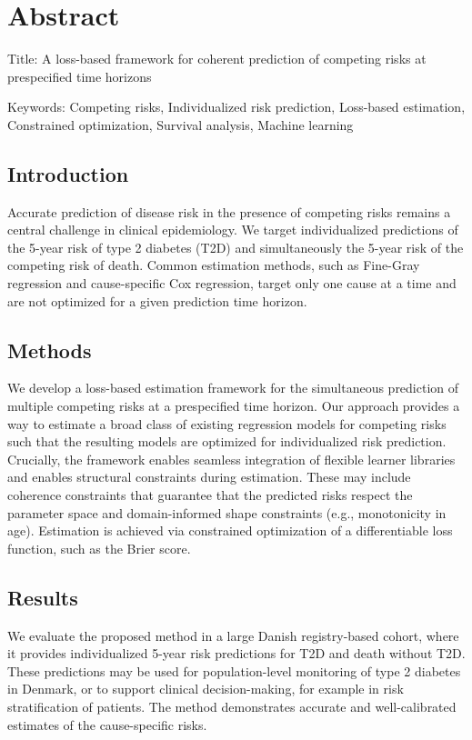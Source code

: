 \documentclass[11pt]{article}
\author{Hjalte Søberg Mikkelsen}
\date{\today}
\title{}
\begin{document}
\tableofcontents

\section{Abstract}
\label{sec:org7ab9e6a}
Title: A loss-based framework for coherent prediction of competing risks at prespecified time horizons

Keywords: Competing risks, Individualized risk prediction, Loss-based
          estimation, Constrained optimization, Survival analysis, Machine learning

\subsection{Introduction}
\label{sec:orga21d434}
Accurate prediction of disease risk in the presence of competing risks remains a central challenge in clinical epidemiology. We target individualized predictions of the 5-year risk of type 2 diabetes (T2D) and simultaneously the 5-year risk of the competing risk of death. Common estimation methods, such as Fine-Gray regression and cause-specific Cox regression, target only one cause at a time and are not optimized for a given prediction time horizon.

\subsection{Methods}
\label{sec:orgfb22391}
We develop a loss-based estimation framework for the simultaneous prediction of multiple competing risks at a prespecified time horizon. Our approach provides a way to estimate a broad class of existing regression models for competing risks such that the resulting models are optimized for individualized risk prediction. Crucially, the framework enables seamless integration of flexible learner libraries and enables structural constraints during estimation. These may include coherence constraints that guarantee that the predicted risks respect the parameter space and domain-informed shape constraints (e.g., monotonicity in age). Estimation is achieved via constrained optimization of a differentiable loss function, such as the Brier score.

\subsection{Results}
\label{sec:org5e48590}
We evaluate the proposed method in a large Danish registry-based cohort, where it provides individualized 5-year risk predictions for T2D and death without T2D. These predictions may be used for population-level monitoring of type 2 diabetes in Denmark, or to support clinical decision-making, for example in risk stratification of patients. The method demonstrates accurate and well-calibrated estimates of the cause-specific risks.
\end{document}
